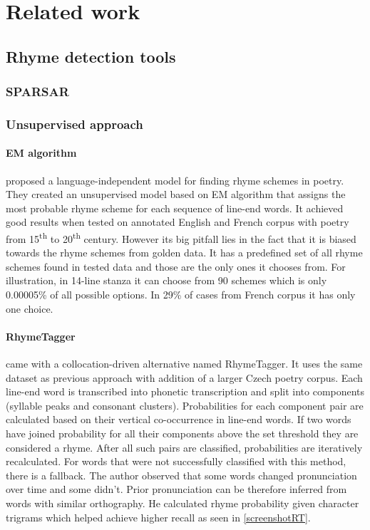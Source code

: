 \chapter{Related work}


\section{Rhyme detection tools}
\subsection{SPARSAR}


\subsection{Unsupervised approach}
\subsubsection*{EM algorithm}
\cite{reddy2011unsupervised} proposed a language-independent model for finding rhyme schemes in poetry. They created an unsupervised model based on EM algorithm that assigns the most probable rhyme scheme for each sequence of line-end words. It achieved good results when tested on annotated English and French corpus with poetry from 15\textsuperscript{th} to 20\textsuperscript{th} century. However its big pitfall lies in the fact that it is biased towards the rhyme schemes from golden data. It has a predefined set of all rhyme schemes found in tested data and those are the only ones it chooses from. For illustration, in 14-line stanza it can choose from 90 schemes which is only 0.00005\% of all possible options. In 29\% of cases from French corpus it has only one choice.

\subsubsection*{RhymeTagger}
\cite{plechavc2018collocation} came with a collocation-driven alternative named RhymeTagger. It uses the same dataset as previous approach with addition of a larger Czech poetry corpus. Each line-end word is transcribed into phonetic transcription and split into components (syllable peaks and consonant clusters). Probabilities for each component pair are calculated based on their vertical co-occurrence in line-end words. If two words have joined probability for all their components above the set threshold they are considered a rhyme. After all such pairs are classified, probabilities are iteratively recalculated. For words that were not successfully classified with this method, there is a fallback. The author observed that some words changed pronunciation over time and some didn't. Prior pronunciation can be therefore inferred from words with similar orthography. He calculated rhyme probability given character trigrams which helped achieve higher recall as seen in \ref{screenshotRT}.

